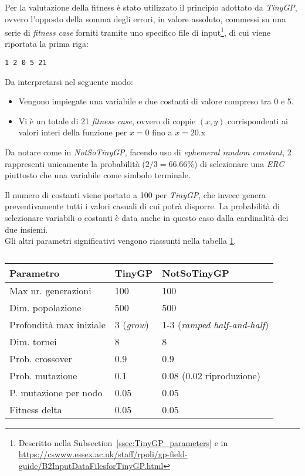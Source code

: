 \documentclass{../llncs}
\newcommand{\xss}[1]{\subsectionname~\ref{ssec:#1}}
\newcommand{\subsectionname}{Subsection}
\begin{document}
Per la valutazione della fitness è stato utilizzato il principio adottato da \emph{TinyGP}, ovvero l'opposto della somma degli errori, in valore assoluto, commessi su una serie di \emph{fitness case} forniti tramite uno specifico file di input\footnote{Descritto nella \xss{TinyGP_parameters} e in \url{https://cswww.essex.ac.uk/staff/rpoli/gp-field-guide/B2InputDataFilesforTinyGP.html}}, di cui viene riportata la prima riga:
\begin{lstlisting}[caption={Prima riga di \texttt{/NotSoTinyGP/resources/polynomial-data.txt}}]
1 2 0 5 21
\end{lstlisting}

\noindent Da interpretarsi nel seguente modo:
\begin{itemize}
\item Vengono impiegate una variabile e due costanti di valore compreso tra 0 e 5.
\item Vi è un totale di 21 \emph{fitness case}, ovvero di coppie $(x ,y)$ corrispondenti ai valori interi della funzione per $x=0$ fino a $x=20$.x
\end{itemize}

Da notare come in \emph{NotSoTinyGP}, facendo uso di \emph{ephemeral random constant}, 2 rappresenti unicamente la probabilità ($2/3=66.66\%$) di selezionare una \emph{ERC} piuttosto che una variabile come simbolo terminale.

Il numero di costanti viene portato a 100 per \emph{TinyGP}, che invece genera preventivamente tutti i valori casuali di cui potrà disporre. La probabilità di selezionare variabili o costanti è data anche in questo caso dalla cardinalità dei due insiemi.\\

\noindent Gli altri parametri significativi vengono riassunti nella tabella \ref{tablePolynomialParams}.\\

\begin{table}
\begin{tabular}{l | p{2.7cm} | p{4.3cm}}
\textbf{Parametro}			& \textbf{TinyGP}	& \textbf{NotSoTinyGP}				\\ \hline
Max nr. generazioni			& 100 				& 100 								\\ \hline
Dim. popolazione			& 500 				& 500 								\\ \hline 
Profondità max iniziale		& 3 (\emph{grow}) 	& 1-3 (\emph{ramped half-and-half})	\\ \hline
Dim. tornei 				& 8 				& 8									\\ \hline
Prob. crossover 			& 0.9 				& 0.9 								\\ \hline
Prob. mutazione 			& 0.1 				& 0.08 (0.02 riproduzione)			\\ \hline
P. mutazione per nodo 		& 0.05 				& 0.05 								\\ \hline
Fitness delta 				& 0.05 				& 0.05 								\\
\end{tabular}
\caption{} \label{tablePolynomialParams}
\end{table}
\end{document}
